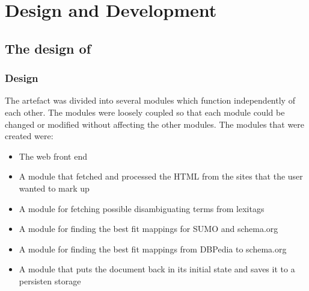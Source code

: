 
\chapter{Design and Development} %

\label{DesignAndDevelopment} %



\section{The design of \theartefact}

\subsection{Design}
The artefact was divided into several modules which function independently of each other.
The modules were loosely coupled so that each module could be changed or modified without affecting the other modules.
The modules that were created were:
\begin{itemize}
	\item The web front end
	\item A module that fetched and processed the HTML from the sites that the user wanted to mark up
	\item A module for fetching possible disambiguating terms from lexitags
	\item A module for finding the best fit mappings for SUMO and schema.org
	\item A module for finding the best fit mappings from DBPedia to schema.org
	\item A module that puts the document back in its initial state and saves it to a persisten storage
\end{itemize}



